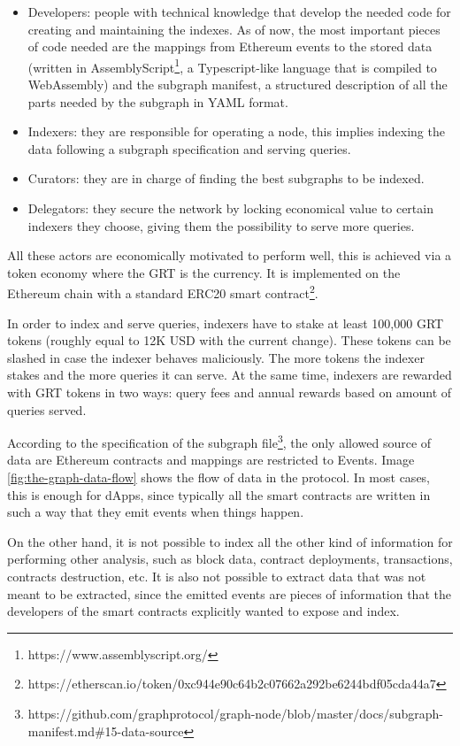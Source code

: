 \begin{itemize}
  \item Developers: people with technical knowledge that develop the needed code for creating and maintaining the indexes. As of now, the most important pieces of code needed are the mappings from Ethereum events to the stored data (written in AssemblyScript\footnote{https://www.assemblyscript.org/}, a Typescript-like language that is compiled to WebAssembly) and the subgraph manifest, a structured description of all the parts needed by the subgraph in YAML format.  
  \item Indexers: they are responsible for operating a node, this implies indexing the data following a subgraph specification and serving queries.
  \item Curators: they are in charge of finding the best subgraphs to be indexed.
  \item Delegators: they secure the network by locking economical value to certain indexers they choose, giving them the possibility to serve more queries.
\end{itemize}

All these actors are economically motivated to perform well, this is achieved via a token economy where the GRT is the currency. It is implemented on the Ethereum chain with a standard ERC20 smart contract\footnote{https://etherscan.io/token/0xc944e90c64b2c07662a292be6244bdf05cda44a7}.

In order to index and serve queries, indexers have to stake at least 100,000 GRT tokens (roughly equal to 12K USD with the current change). These tokens can be slashed in case the indexer behaves maliciously. The more tokens the indexer stakes and the more queries it can serve. At the same time, indexers are rewarded with GRT tokens in two ways: query fees and annual rewards based on amount of queries served.

According to the specification of the subgraph file\footnote{https://github.com/graphprotocol/graph-node/blob/master/docs/subgraph-manifest.md\#15-data-source}, the only allowed source of data are Ethereum contracts and mappings are restricted to Events. Image \ref{fig:the-graph-data-flow} shows the flow of data in the protocol. In most cases, this is enough for dApps, since typically all the smart contracts are written in such a way that they emit events when things happen. 

On the other hand, it is not possible to index all the other kind of information for performing other analysis, such as block data, contract deployments, transactions, contracts destruction, etc. It is also not possible to extract data that was not meant to be extracted, since the emitted events are pieces of information that the developers of the smart contracts explicitly wanted to expose and index. 


